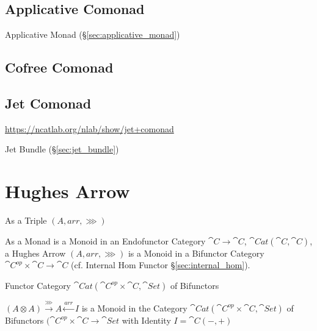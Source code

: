 \subsection{Applicative Comonad}\label{sec:applicative_comonad}

Applicative Monad (\S\ref{sec:applicative_monad})



\subsection{Cofree Comonad}\label{sec:cofree_comonad}

\subsection{Jet Comonad}\label{sec:jet_comonad}

\url{https://ncatlab.org/nlab/show/jet+comonad}

\fist Jet Bundle (\S\ref{sec:jet_bundle})



\section{Hughes Arrow}\label{sec:hughes_arrow}

As a Triple $(A, arr, \ggg)$

As a Monad is a Monoid in an Endofunctor Category $\cat{C} \rightarrow
\cat{C}$, $\cat{Cat}(\cat{C},\cat{C})$, a Hughes Arrow $(A, arr,
\ggg)$ is a Monoid in a Bifunctor Category $\cat{C}^{op} \times
\cat{C} \rightarrow \cat{C}$ (cf. Internal Hom Functor
\S\ref{sec:internal_hom}).

Functor Category $\cat{Cat}(\cat{C}^{op} \times \cat{C},
\cat{Set})$ of Bifunctors

$(A \otimes A) \xrightarrow{\ggg} A \xleftarrow{arr} I$ is a Monoid in
the Category $\cat{Cat} (\cat{C}^{op} \times \cat{C}, \cat{Set})$ of
Bifunctors $(\cat{C}^{op} \times \cat{C} \rightarrow \cat{Set}$ with
Identity $I = \cat{C} (-,+)$

